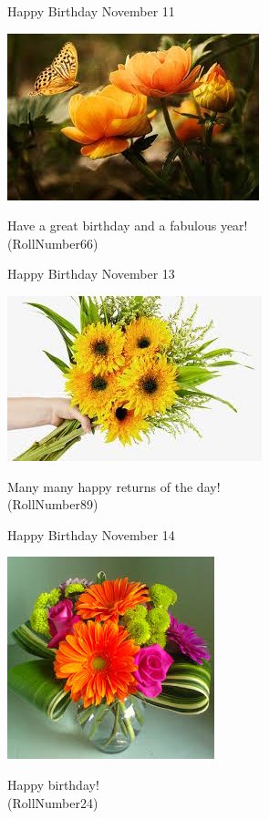 \documentclass[table, landscape]{beamer}
\begin{document}
\begin{frame}{\color{red}Happy Birthday }
{November 11}
\begin{center}
\includegraphics[height=0.5\textheight]{flowers/f7.jpeg}

Have a great birthday and a fabulous year! \\ \vspace{0.5cm}{\Large name59} (RollNumber66)
\end{center}
\end{frame}
\begin{frame}{\color{blue}Happy Birthday }
{November 13}
\begin{center}
\includegraphics[height=0.5\textheight]{flowers/f6.jpeg}

Many many happy returns of the day! \\ \vspace{0.5cm}{\Large name82} (RollNumber89)
\end{center}
\end{frame}
\begin{frame}{\color{red}Happy Birthday }
{November 14}
\begin{center}
\includegraphics[height=0.5\textheight]{flowers/f8.jpeg}

Happy birthday! \\ \vspace{0.5cm}{\Large name19} (RollNumber24)
\end{center}
\end{frame}
\end{document}
